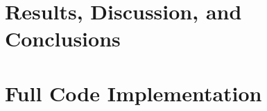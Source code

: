 \documentclass[a4paper, 11pt, oneside]{Thesis}  %
\begin{document}
\part{Results, Discussion, and Conclusions}

%



\part{Full Code Implementation}
\begin{appendix}





\end{appendix}



\end{document}
